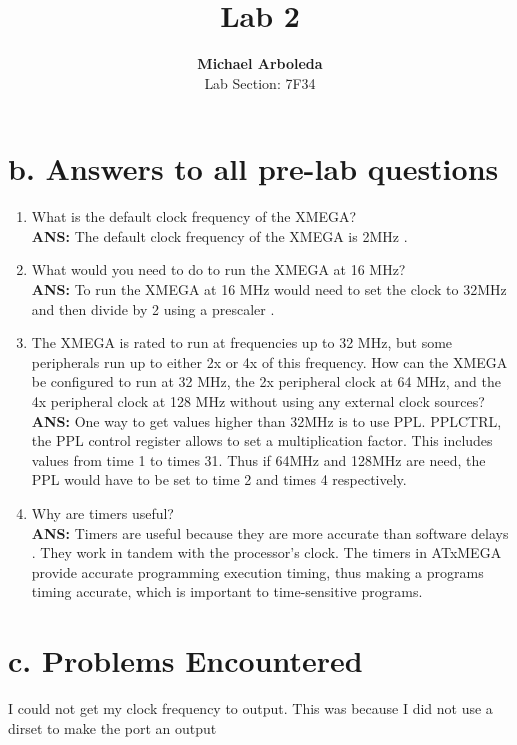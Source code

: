 \documentclass[11pt]{article}
\theoremstyle{plain}
\theoremstyle{definition}
\begin{document}
\captionsetup[figure]{labelfont=bf} 

\title{Lab 2}
\author{\textbf{Michael Arboleda}\\Lab Section: 7F34}
\maketitle
%
%
\section*{b. Answers to all pre-lab questions}
\begin{enumerate}[label={\arabic*)},font={\color{red}\bfseries}]
	\item What is the default clock frequency of the XMEGA?
	\\[0.8ex]
	\textbf{ANS:} The default clock frequency of the XMEGA is 2MHz
	.
	\item What would you need to do to run the XMEGA at 16 MHz?
	\\[0.8ex]
	\textbf{ANS:} To run the XMEGA at 16 MHz would need to set the clock to 32MHz and then divide by 2 using a prescaler
	.
	\item The XMEGA is rated to run at frequencies up to 32 MHz, but some peripherals run up to either 2x or 4x of this frequency. How can the XMEGA be configured to run at 32 MHz, the 2x peripheral clock at 64 MHz, and the 4x peripheral clock at 128 MHz without using any external clock sources? 
	\\[0.8ex]
	\textbf{ANS:}
	One way to get values higher than 32MHz is to use PPL. PPLCTRL, the PPL control register allows to set a multiplication factor. This includes values from time 1 to times 31. Thus if 64MHz and 128MHz are need, the PPL would have to be set to time 2 and times 4 respectively.
	\item Why are timers useful? 
	\\[0.8ex]
	\textbf{ANS:}  Timers are useful because they are more accurate than software delays . They work in tandem with the processor’s clock. The timers in ATxMEGA provide accurate programming execution timing, thus making a programs timing accurate, which is important to time-sensitive programs.
\end{enumerate}
%
%
\section*{c. Problems Encountered}
I could not get my clock frequency to output. This was because I did not use a dirset to make the port an output 
%
%
\end{document}
